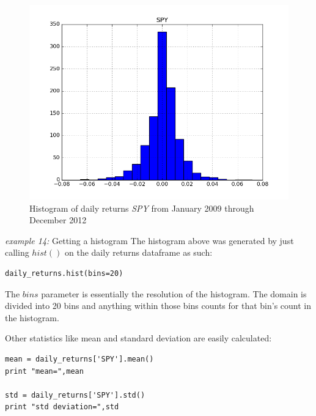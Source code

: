 \begin{figure}[h!]
	\centering
	\includegraphics[width=\textwidth]{images/histograms_1.png}
    \caption{Histogram of daily returns \textit{SPY} from January 2009 through December 2012}
\end{figure}
\newpage

\noindent\begin{minipage}{\linewidth}
\noindent\textit{example 14:} Getting a histogram
\noindent The histogram above was generated by just calling $hist()$ on the daily returns dataframe as such:

\begin{lstlisting}[style=python]
daily_returns.hist(bins=20)
\end{lstlisting}
\end{minipage}

\noindent The $bins$ parameter is essentially the resolution of the histogram. The domain is divided into 20 bins and anything within those bins counts for that bin's count in the histogram.

\noindent Other statistics like mean and standard deviation are easily calculated:

\noindent\begin{minipage}{\linewidth}
\begin{lstlisting}[style=python]
mean = daily_returns['SPY'].mean()
print "mean=",mean

std = daily_returns['SPY'].std()
print "std deviation=",std
\end{lstlisting}
\end{minipage}

